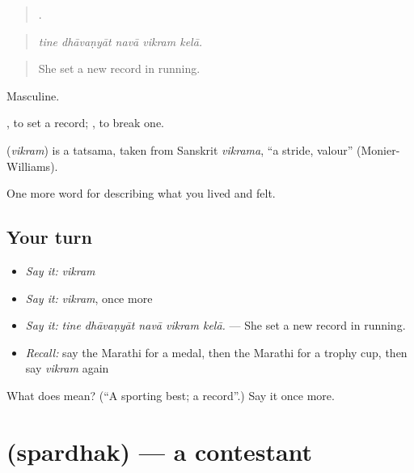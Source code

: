 \begin{quote}
    .
\end{quote}

\begin{quote}
\emph{tine dhāvaṇyāt navā vikram kelā.}
\end{quote}

\begin{quote}
She set a new record in running.
\end{quote}

Masculine.

 , to set a record;  , to break one.

\begin{cousinweb}
\textbf{} (\emph{vikram}) is a tatsama, taken from Sanskrit \emph{vikrama}, \textquotedblleft{}a stride, valour\textquotedblright{} (Monier-Williams).
\end{cousinweb}

\begin{grammarlens}[title={What you've built}]
One more word for describing what you lived and felt.
\end{grammarlens}

\subsection*{Your turn}
\begin{itemize}
\raggedright
  \item \emph{Say it:} \emph{vikram}
  \item \emph{Say it:} \emph{vikram}, once more
  \item \emph{Say it:} \emph{tine dhāvaṇyāt navā vikram kelā.} — She set a new record in running.
  \item \emph{Recall:} say the Marathi for a medal, then the Marathi for a trophy cup, then say \emph{vikram} again
\end{itemize}

\begin{tcolorbox}[breakable,colback=teal!4,colframe=teal!35!black,title={Before you move on}]
What does  mean? (\textquotedblleft{}A sporting best; a record\textquotedblright{}.) Say it once more.
\end{tcolorbox}
\section[\texorpdfstring{\mr{स्पर्धक} (spardhak)}{स्पर्धक (spardhak)}]{ (spardhak) — a contestant}

